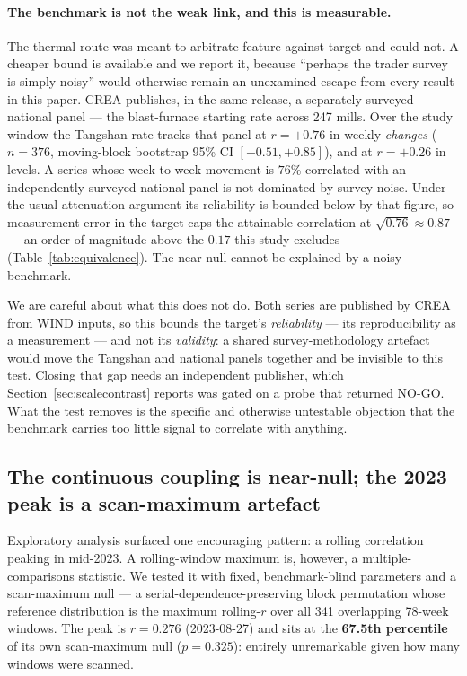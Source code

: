 \documentclass[11pt,a4paper]{article}
\newcommand{\rval}[1]{\mbox{$r=#1$}}
\begin{document}
\paragraph{The benchmark is not the weak link, and this is measurable.} The thermal route was
meant to arbitrate feature against target and could not. A cheaper bound is available and we
report it, because ``perhaps the trader survey is simply noisy'' would otherwise remain an
unexamined escape from every result in this paper. CREA publishes, in the same release, a
separately surveyed national panel --- the blast-furnace starting rate across 247 mills. Over the
study window the Tangshan rate tracks that panel at \rval{+0.76} in weekly \emph{changes}
($n=376$, moving-block bootstrap 95\% CI $[+0.51,+0.85]$), and at \rval{+0.26} in levels. A series
whose week-to-week movement is $76\%$ correlated with an independently surveyed national panel is
not dominated by survey noise. Under the usual attenuation argument its reliability is bounded
below by that figure, so measurement error in the target caps the attainable correlation at
$\sqrt{0.76}\approx0.87$ --- an order of magnitude above the $0.17$ this study excludes
(Table~\ref{tab:equivalence}). The near-null cannot be explained by a noisy benchmark.

We are careful about what this does not do. Both series are published by CREA from WIND inputs, so
this bounds the target's \emph{reliability} --- its reproducibility as a measurement --- and not
its \emph{validity}: a shared survey-methodology artefact would move the Tangshan and national
panels together and be invisible to this test. Closing that gap needs an independent publisher,
which Section~\ref{sec:scalecontrast} reports was gated on a probe that returned NO-GO. What the
test removes is the specific and otherwise untestable objection that the benchmark carries too
little signal to correlate with anything.

\subsection{The continuous coupling is near-null; the 2023 peak is a scan-maximum artefact}
\label{sec:regime}

Exploratory analysis surfaced one encouraging pattern: a rolling correlation peaking in mid-2023.
A rolling-window maximum is, however, a multiple-comparisons statistic. We tested it with fixed,
benchmark-blind parameters and a scan-maximum null --- a serial-dependence-preserving block
permutation whose reference distribution is the maximum rolling-$r$ over all 341 overlapping
78-week windows. The peak is \rval{0.276} (2023-08-27) and sits at the \textbf{67.5th percentile}
of its own scan-maximum null ($p=0.325$): entirely unremarkable given how many windows were
scanned.
\end{document}
